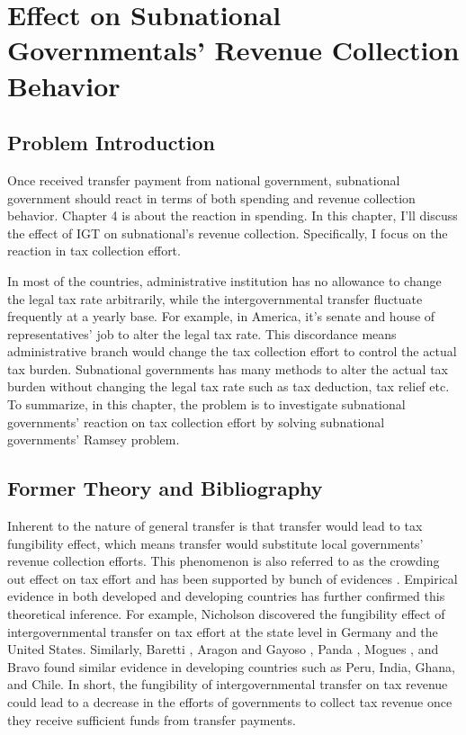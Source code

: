 
\chapter{Effect on Subnational Governmentals' Revenue Collection Behavior}

\section{Problem Introduction}

Once received transfer payment from national government, subnational government should react in terms of both spending and revenue collection behavior. Chapter 4 is about the reaction in spending. In this chapter, I'll discuss the effect of IGT on subnational's revenue collection. Specifically, I focus on the reaction in tax collection effort.

In most of the countries, administrative institution has no allowance to change the legal tax rate arbitrarily, while the intergovernmental transfer fluctuate frequently at a yearly base. For example, in America, it's senate and house of representatives' job to alter the legal tax rate. This discordance means administrative branch would change the tax collection effort to control the actual tax burden. Subnational governments has many methods to alter the actual tax burden without changing the legal tax rate such as tax deduction, tax relief etc. To summarize, in this chapter, the problem is to investigate subnational governments' reaction on tax collection effort by solving subnational governments' Ramsey problem.

\section{Former Theory and Bibliography}

Inherent to the nature of general transfer is that transfer would lead to tax fungibility effect, which means transfer would substitute local governments' revenue collection efforts. This phenomenon is also referred to as the crowding out effect on tax effort and has been supported by bunch of evidences \cite{inman1988federal,peterson1997decentralization,litvack1998rethinking}. Empirical evidence in both developed and developing countries has further confirmed this theoretical inference. For example, Nicholson \cite{nicholson2008fiscal} discovered the fungibility effect of intergovernmental transfer on tax effort at the state level in Germany and the United States. Similarly, Baretti \cite{2002A}, Aragon and Gayoso \cite{aragon2005intergovernmental}, Panda \cite{panda2009central}, Mogues \cite{mogues2012external}, and Bravo \cite{bravo2013income} found similar evidence in developing countries such as Peru, India, Ghana, and Chile. In short, the fungibility of intergovernmental transfer on tax revenue could lead to a decrease in the efforts of governments to collect tax revenue once they receive sufficient funds from transfer payments.


